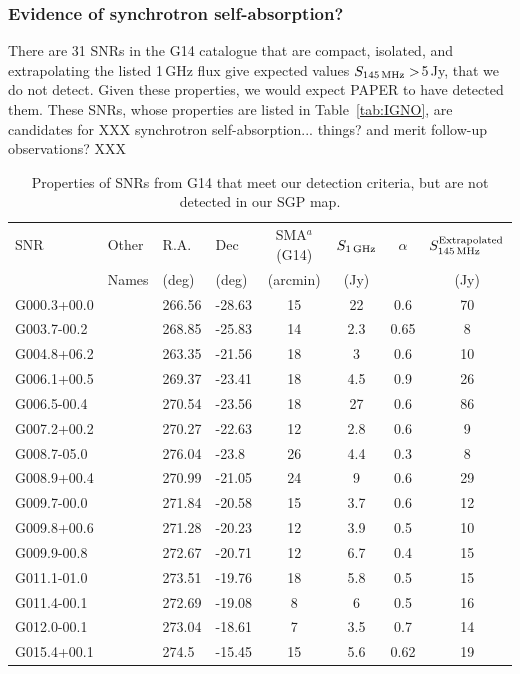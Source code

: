 \documentclass[useAMS,usenatbib]{mn2e}
\begin{document}
\subsubsection{Evidence of synchrotron self-absorption?}

There are 31 SNRs in the G14 catalogue that are compact, isolated, and extrapolating the listed 1\,GHz flux give expected values $S_{145\,{\rm MHz}}>$5\,Jy, that we do not detect. Given these properties, we would expect PAPER to have detected them. These SNRs, whose properties are listed in Table~\ref{tab:IGNO}, are candidates for XXX synchrotron self-absorption... things?  and merit follow-up observations? XXX

\begin{table}
\caption{Properties of SNRs from G14 that meet our detection criteria, but are not detected in our SGP map.}
\begin{tabular}{llllcccc}
\hline
SNR	&	Other	&	R.A.	&	Dec	&	SMA$^a$ (G14)	&	$S_{1\,{\rm GHz}}$ &	$\alpha$ 	&	$S^{\rm Extrapolated}_{145\,{\rm MHz}}$			\\
	&	Names	&	(deg)	&	(deg)	&	(arcmin)	&	(Jy)	&			&	(Jy)			\\
\hline
G000.3+00.0	&		&	266.56	&	-28.63	&	15	&	22	&	0.6	&	70	\\
G003.7-00.2	&		&	268.85	&	-25.83	&	14	&	2.3	&	0.65	&	8	\\
G004.8+06.2	&		&	263.35	&	-21.56	&	18	&	3	&	0.6	&	10	\\
G006.1+00.5	&		&	269.37	&	-23.41	&	18	&	4.5	&	0.9	&	26	\\
G006.5-00.4	&		&	270.54	&	-23.56	&	18	&	27	&	0.6	&	86	\\
G007.2+00.2	&		&	270.27	&	-22.63	&	12	&	2.8	&	0.6	&	9	\\
G008.7-05.0	&		&	276.04	&	-23.8	&	26	&	4.4	&	0.3	&	8	\\
G008.9+00.4	&		&	270.99	&	-21.05	&	24	&	9	&	0.6	&	29	\\
G009.7-00.0	&		&	271.84	&	-20.58	&	15	&	3.7	&	0.6	&	12	\\
G009.8+00.6	&		&	271.28	&	-20.23	&	12	&	3.9	&	0.5	&	10	\\
G009.9-00.8	&		&	272.67	&	-20.71	&	12	&	6.7	&	0.4	&	15	\\
G011.1-01.0	&		&	273.51	&	-19.76	&	18	&	5.8	&	0.5	&	15	\\
G011.4-00.1	&		&	272.69	&	-19.08	&	8	&	6	&	0.5	&	16	\\
G012.0-00.1	&		&	273.04	&	-18.61	&	7	&	3.5	&	0.7	&	14	\\
G015.4+00.1	&		&	274.5	&	-15.45	&	15	&	5.6	&	0.62	&	19	\\

\end{tabular}
\end{table}
\end{document}
